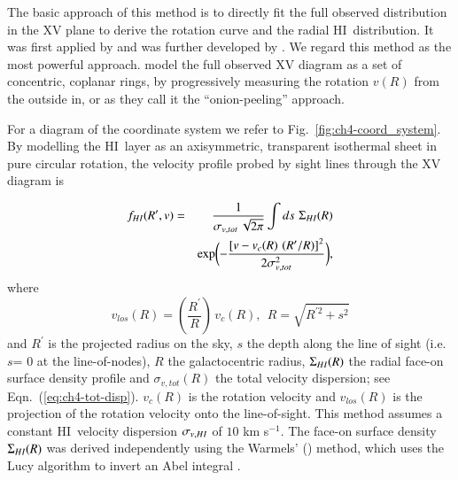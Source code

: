 \documentclass[traditabstract]{aa} %
\newcommand\HI{H{\small I}}
\newcommand\kms{km s$^{-1}$}
\begin{document}
The basic approach of this method is to directly fit the full
observed distribution in the XV plane to derive the
rotation curve and the radial \HI\ distribution. It was first applied by 
\citet{vdkruit1981} and was further developed by \citet{kvdk2004}. 
We regard this method as the most powerful approach. 
\citet{kvdk2004} model the full observed XV
diagram as a set of concentric, coplanar rings, by progressively
measuring the rotation $v(R)$ from the outside in, or as they call it
the ``onion-peeling'' approach.

For a diagram of the coordinate system we refer to
Fig.~\ref{fig:ch4-coord_system}. By modelling the \HI\ layer as an
axisymmetric, transparent isothermal sheet in pure circular rotation,
the velocity profile probed by sight lines through the XV diagram is

\begin{eqnarray}
  \label{ch4-vel-profile}
f_{\HI}(R^\prime,v) &=&\frac{1}{\sigma_{v,tot} \, \sqrt{2\pi}}
\int ds \,\,\Sigma_{\HI}(R)  \\
& & {\rm exp}\biggl( -\frac{\left[v - v_c(R)\,\,(R^{\prime}/R)\right]^2}
  {2 \sigma_{v,tot}^2}\biggr), \nonumber 
\end{eqnarray}
where
\begin{equation}
v_{los}(R) = \left(\frac{R^{\prime}}{R}\right) \, v_c(R), \ \ 
R = \sqrt{R^{\prime 2} + s^2} \nonumber 
\end{equation}
and  $R^{\prime}$ is the projected radius on the sky, $s$ the depth
along the line of sight (i.e. $s$= 0  at the line-of-nodes), $R$ the
galactocentric radius, $\Sigma_{\HI}(R)$ the radial face-on surface
density profile and $\sigma_{v,tot}(R)$ the total velocity
dispersion; see Eqn.~(\ref{eq:ch4-tot-disp}). $v_c(R)$ is the rotation
velocity and $v_{los}(R)$ is the projection of the rotation velocity
onto the line-of-sight.  This method assumes a constant
\HI\ velocity dispersion $\sigma_{v,\HI}$ of $10$ \kms. The face-on
surface density $\Sigma_{\HI}(R)$ was derived independently using the
Warmels' (\citeyear{warmels1988}) method, which uses the
Lucy algorithm to invert an Abel integral
\citep[e.g.][Eqn.~(1B) - (59b)]{bt1987}.
\end{document}
